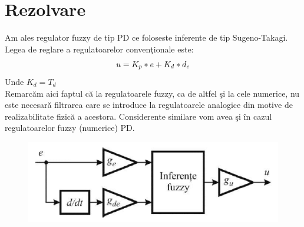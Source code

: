 \documentclass[11pt]{article}
\newcommand{\EqRow}{\vspace{1.5mm}}
\begin{document}
\section{Rezolvare}

Am ales regulator fuzzy de tip PD ce foloseste inferente de tip Sugeno-Takagi.
Legea de reglare a regulatoarelor convenţionale este:
\begin{equation} 
u=K_p*e+K_d*d_e
\EqRow
\end{equation}
Unde $K_d=T_d$\\
 Remarcăm aici faptul că la regulatoarele fuzzy, ca de altfel şi la cele numerice, nu este necesară filtrarea care se introduce la regulatoarele analogice din motive de realizabilitate fizică a acestora. Considerente similare vom avea şi în cazul regulatoarelor fuzzy (numerice) PD.

\begin{figure}[H]
	\centering
	\includegraphics[width=0.4\linewidth]{schema_pid.PNG}
	\label{fig:test2}
\end{figure}
\end{document}

